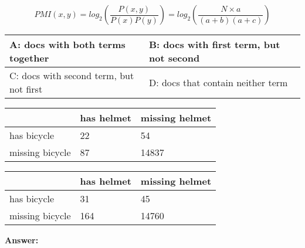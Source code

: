 \documentclass[11pt]{article}
\begin{document}
\begin{enumerate}
        \begin{equation*}
            PMI(x,y)=log_2\left(\frac{P(x,y)}{P(x)P(y)}\right)=log_2\left(\frac{N\times a}{(a+b)(a+c)}\right)
        \end{equation*}

        \begin{table}[ht]
            \footnotesize
            \begin{tabular}[t]{|a{1.6cm}|a{1.6cm}|}
                \hline
                A: docs with both terms together & B: docs with first term, but not second
                \\ \hline
                C: docs with second term, but not first & D: docs that contain neither term
                \\ \hline
            \end{tabular}
            \hfill
            \begin{tabular}[t]{|M{1.15cm}|M{1.15cm}|M{1.15cm}|}
                \hline
                & has helmet & missing helmet
                \\ \hline
                has bicycle & 22 & 54
                \\ \hline
                missing bicycle & 87 & 14837
                \\ \hline
            \end{tabular}
            \hfill
            \begin{tabular}[t]{|M{1.15cm}|M{1.15cm}|M{1.15cm}|}
                \hline
                & has helmet & missing helmet
                \\ \hline
                has bicycle & 31 & 45
                \\ \hline
                missing bicycle & 164 & 14760
                \\ \hline
            \end{tabular}
        \end{table}

        \textbf{Answer:}

    \end{enumerate}
\end{document}
